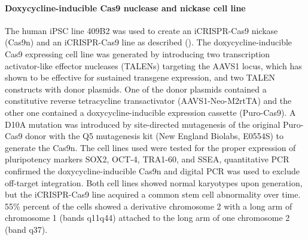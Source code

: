 \paragraph{Doxycycline-inducible Cas9 nuclease and nickase cell line}
The human iPSC line 409B2 was used to create an iCRISPR-Cas9 nickase (Cas9n) and an iCRISPR-Cas9 line as described (\cite{gonzalez_icrispr_2014}). The doxycycline-inducible Cas9 expressing cell line was generated by introducing two transcription activator-like effector nucleases (TALENs) targeting the AAVS1 locus, which has shown to be effective for sustained transgene expression, and two TALEN constructs with donor plasmids. One of the donor plasmids contained a constitutive reverse tetracycline transactivator (AAVS1-Neo-M2rtTA) and the other one contained a doxycycline-inducible expression cassette (Puro-Cas9). A D10A mutation was introduced by site-directed mutagenesis of the original Puro-Cas9 donor with the Q5 mutagenesis kit (New England Biolabs, E0554S) to generate the Cas9n. The cell lines used were tested for the proper expression of pluripotency markers SOX2, OCT-4, TRA1-60, and SSEA, quantitative PCR confirmed the doxycycline-inducible Cas9n and digital PCR was used to exclude off-target integration. Both cell lines showed normal karyotypes upon generation, but the iCRISPR-Cas9 line acquired a common stem cell abnormality over time. 55\% percent of the cells showed  a  derivative  chromosome  2  with  a  long  arm  of chromosome  1 (bands  q11q44)  attached  to  the  long  arm  of  one chromosome  2  (band  q37).
 
